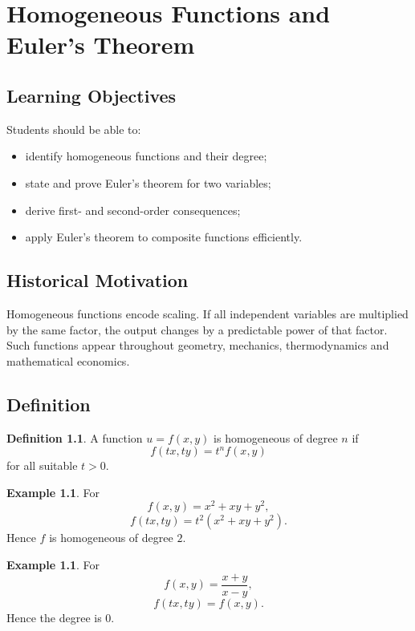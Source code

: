 \documentclass[11pt,oneside]{book}
\theoremstyle{studentthm}
\theoremstyle{definition}
\newtheorem{definition}[theorem]{Definition}
\newtheorem{example}[theorem]{Example}
\begin{document}
\chapter{Homogeneous Functions and Euler's Theorem}

\section*{Learning Objectives}
Students should be able to:
\begin{itemize}
\item identify homogeneous functions and their degree;
\item state and prove Euler's theorem for two variables;
\item derive first- and second-order consequences;
\item apply Euler's theorem to composite functions efficiently.
\end{itemize}

\section*{Historical Motivation}

Homogeneous functions encode scaling. If all independent variables are
multiplied by the same factor, the output changes by a predictable
power of that factor. Such functions appear throughout geometry,
mechanics, thermodynamics and mathematical economics.

\section{Definition}

\begin{definition}
A function \(u=f(x,y)\) is homogeneous of degree \(n\) if
\[
f(tx,ty)=t^n f(x,y)
\]
for all suitable \(t>0\).
\end{definition}

\begin{example}
For
\[
f(x,y)=x^2+xy+y^2,
\]
\[
f(tx,ty)
=
t^2(x^2+xy+y^2).
\]
Hence \(f\) is homogeneous of degree \(2\).
\end{example}

\begin{example}
For
\[
f(x,y)=\frac{x+y}{x-y},
\]
\[
f(tx,ty)=f(x,y).
\]
Hence the degree is \(0\).
\end{example}
\end{document}

